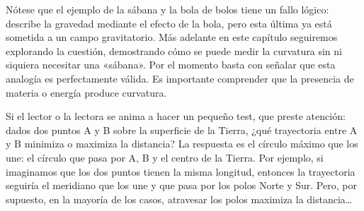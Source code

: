 \begin{description}[style=multiline,leftmargin=2em,labelwidth=1.5em]
\item[4.]\hypertarget{note:03-04}{}Nótese que el ejemplo de la sábana y la bola de bolos tiene
un fallo lógico: describe la gravedad mediante el efecto de la bola, pero esta última ya
está sometida a un campo gravitatorio. Más adelante en este capítulo seguiremos explorando
la cuestión, demostrando cómo se puede medir la curvatura sin ni siquiera necesitar una
«sábana». Por el momento basta con señalar que esta analogía es perfectamente válida.
Es importante comprender que la presencia de materia o energía produce curvatura.

\item[5.]\hypertarget{note:03-05}{}Si el lector o la lectora se anima a hacer un pequeño test,
que preste atención: dados dos puntos A y B sobre la superficie de la Tierra, ¿qué trayectoria
entre A y B minimiza o maximiza la distancia? La respuesta es el círculo máximo que los une:
el círculo que pasa por A, B y el centro de la Tierra. Por ejemplo, si imaginamos que los
dos puntos tienen la misma longitud, entonces la trayectoria seguiría el meridiano que los
une y que pasa por los polos Norte y Sur. Pero, por supuesto, en la mayoría de los casos,
atravesar los polos maximiza la distancia…

\end{description}
